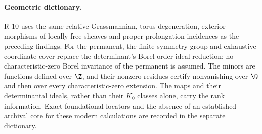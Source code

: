 \paragraph{Geometric dictionary.}
R-10 uses the same relative Grassmannian, torus degeneration,
exterior morphisms of locally free sheaves and proper
prolongation incidences as the preceding findings. For the
permanent, the finite symmetry group and exhaustive coordinate
cover replace the determinant's Borel order-ideal reduction;
no characteristic-zero Borel invariance of the permanent is
assumed. The minors are functions defined over $\Z$, and their
nonzero residues certify nonvanishing over $\Q$ and then over
every characteristic-zero extension. The maps and their
determinantal ideals, rather than their $K_0$ classes alone,
carry the rank information. Exact foundational locators and
the absence of an established archival cote for these modern
calculations are recorded in the separate dictionary.
